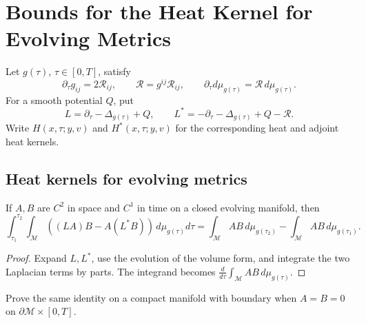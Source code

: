 \chapter[26]{Bounds for the Heat Kernel for Evolving Metrics}
\label{ch:chow-iii-heat-kernel-bounds-evolving-metrics}

Let \(g(\tau)\), \(\tau\in[0,T]\), satisfy
\[
 \partial_\tau g_{ij}=2\mathcal R_{ij},\qquad
 \mathcal R=g^{ij}\mathcal R_{ij},\qquad
 \partial_\tau d\mu_{g(\tau)}=\mathcal R\,d\mu_{g(\tau)}.
\]
For a smooth potential \(Q\), put
\[
 L=\partial_\tau-\Delta_{g(\tau)}+Q,
 \qquad L^*=-\partial_\tau-\Delta_{g(\tau)}+Q-\mathcal R.
\]
Write \(H(x,\tau;y,v)\) and \(H^*(x,\tau;y,v)\) for the corresponding
heat and adjoint heat kernels.

\section{Heat kernels for evolving metrics}

\begin{lemma}
\label{lem:chow-iii-duhamel-evolving-closed}

If \(A,B\) are \(C^2\) in space and \(C^1\) in time on a closed
evolving manifold, then
\[
 \int_{\tau_1}^{\tau_2}\!\int_{\mathcal M}
 ((LA)B-A(L^*B))\,d\mu_{g(\tau)}d\tau
 =\int_{\mathcal M}AB\,d\mu_{g(\tau_2)}
  -\int_{\mathcal M}AB\,d\mu_{g(\tau_1)}.
\]
\end{lemma}
\begin{proof}
\sketch Expand \(L,L^*\), use the evolution of the volume form, and integrate the
two Laplacian terms by parts.  The integrand becomes
\(\frac d{d\tau}\int_{\mathcal M}AB\,d\mu_{g(\tau)}\).
\end{proof}

\begin{claim}
\label{clm:chow-iii-duhamel-dirichlet-exercise}


Prove the same identity on a compact manifold with boundary when
\(A=B=0\) on \(\partial\mathcal M\times[0,T]\).
\end{claim}

